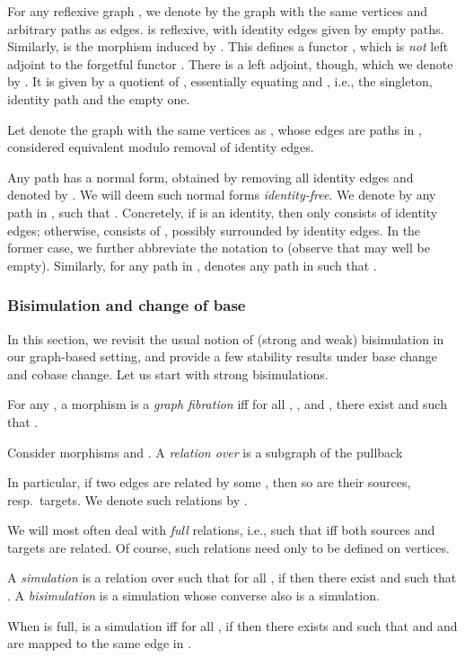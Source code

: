 \documentclass{LMCS}
\theoremstyle{plain}\newtheorem{satz}[thm]{Satz}
\begin{document}
For any reflexive graph , we denote by  the graph with the
same vertices and arbitrary paths as edges.  is reflexive,
with identity edges given by empty paths. Similarly,  is the morphism induced by .
This defines a functor , which is \emph{not} left
adjoint to the forgetful functor .  There is a
left adjoint, though, which we denote by . It is given by
a quotient of , essentially equating  and , i.e.,
the singleton, identity path and the empty one.
\begin{defi}
  Let  denote the graph with the same vertices as ,
  whose edges  are paths  in , considered
  equivalent modulo removal of identity edges.
\end{defi}
Any path  has a normal form, obtained by removing all identity
edges and denoted by .  We will deem such normal forms
\emph{identity-free}.  We denote by 
any path  in , such that
.  Concretely, if  is an
identity, then  only consists of identity edges;
otherwise,  consists of , possibly surrounded by
identity edges. In the former case, we further abbreviate the notation
to  (observe that  may well be empty).  Similarly,
for any path  in ,  denotes any path
 in  such that .

\subsubsection{Bisimulation and change of base} 
In this section, we revisit the usual notion of (strong and weak) bisimulation in our graph-based setting,
and provide a few stability results under base change and cobase change.
Let us start with strong bisimulations.

\begin{defi} For any , a morphism 
  is a \emph{graph fibration} iff for all , , and
  , there exist  and 
  such that .
\end{defi}


Consider morphisms  and .  
A \emph{relation over } is a subgraph of the pullback
\begin{center}
\end{center}
In particular, if two edges  are related by some , then so are their sources, resp.\ targets.
We denote such relations by .

We will most often deal with \emph{full} relations, i.e., such that
 iff both sources and targets are related. Of course, such
relations need only to be defined on vertices.
\begin{defi}
  A \emph{simulation}  is a relation  over  such that for all , if  then there exist  and  such that .  A \emph{bisimulation} is a
  simulation whose converse also is a simulation.
\end{defi}
When  is full,  is a simulation iff for all , if
 then there exists  and  such that
 and  and  are mapped to the same edge in .
\end{document}
